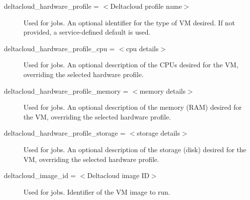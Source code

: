 \begin{description}

\label{condor-submit-deltacloud-hardware-profile}
\item[deltacloud\_hardware\_profile = $<$Deltacloud profile name$>$]
Used for  jobs.
An optional identifier for the type of VM desired. If not provided,
a service-defined default is used.


\label{condor-submit-deltacloud-hardware-profile-cpu}
\item[deltacloud\_hardware\_profile\_cpu = $<$cpu details$>$]
Used for  jobs.
An optional description of the CPUs desired for the VM, overriding
the selected hardware profile.


\label{condor-submit-deltacloud-hardware-profile-memory}
\item[deltacloud\_hardware\_profile\_memory = $<$memory details$>$]
Used for  jobs.
An optional description of the memory (RAM) desired for the VM, overriding
the selected hardware profile.


\label{condor-submit-deltacloud-hardware-profile-storage}
\item[deltacloud\_hardware\_profile\_storage = $<$storage details$>$]
Used for  jobs.
An optional description of the storage (disk) desired for the VM, overriding
the selected hardware profile.


\label{condor-submit-deltacloud-image-id}
\item[deltacloud\_image\_id = $<$Deltacloud image ID$>$]
Used for  jobs.
Identifier of the VM image to run.



\end{description}
